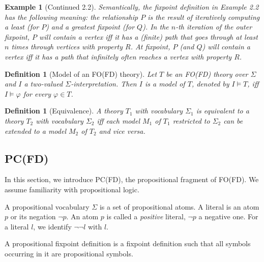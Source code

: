 \documentclass{tlp}
\newcommand{\Voc}{\ensuremath{\Sigma}\xspace}
\newtheorem{example}[lemma]{Example}
\newtheorem{definition}[lemma]{Definition}
\begin{document}
\begin{example}[Continued 2.2]
Semantically, the fixpoint definition in Example 2.2 has the following meaning: the relationship $P$ is the result of iteratively computing a least (for $P$) and a greatest fixpoint (for $Q$). In the $n$-th iteration of the outer fixpoint, $P$ will contain a vertex iff it has a (finite) path that goes through at least $n$ times through vertices with property $R$. At fixpoint, $P$ (and $Q$) will contain a vertex iff it has a path that infinitely often reaches a vertex with property $R$.
\end{example}

\begin{definition}[Model of an FO(FD) theory] \label{def:modelfofdtheory}
Let $T$ be an FO(FD) theory over $\Sigma$ and $I$ a two-valued $\Sigma$-interpretation. Then $I$ is a {\em model} of $T$, denoted by $I \models T$, iff $I \models \varphi$ for every $\varphi \in T$.
\end{definition}

\begin{definition}[Equivalence]
A theory $T_1$ with vocabulary $\Sigma_1$ is equivalent to a theory $T_2$ with vocabulary $\Sigma_2$ iff each model $M_1$ of $T_1$ restricted to $\Sigma_2$ can be extended to a model $M_2$ of $T_2$ and vice versa.
\end{definition}

\subsection{PC(FD)}
In this section, we introduce PC(FD), the propositional fragment of FO(FD). We assume familiarity with propositional logic.

A propositional vocabulary $\Voc$ is a set of propositional atoms. A literal is an atom $p$ or its negation $\neg p$. An atom $p$ is called
a {\em positive} literal, $\neg p$ a negative one. For a literal $l$, we identify $\neg \neg l$ with $l$.



A propositional fixpoint definition is a fixpoint definition such that all symbols occurring in it are propositional symbols.
\end{document}
